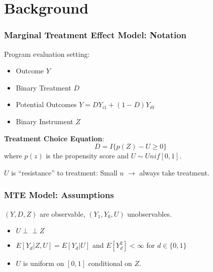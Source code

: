 \documentclass[11pt, aspectratio=169]{beamer}
\newcommand{\indep}{\perp\!\!\!\!\perp}
\begin{document}
\begin{frame}
    \tableofcontents
\end{frame}

\section{Background}

\begin{frame}
    \frametitle{Marginal Treatment Effect Model: Notation}

    Program evaluation setting:
    \begin{itemize}
        \item Outcome $Y$
        \item Binary Treatment $D$
        \item Potential Outcomes $Y = D Y_{i1} + (1-D) Y_{i0}$
        \item Binary Instrument $Z$
    \end{itemize}

    \vspace{0.5cm}

    \textbf{Treatment Choice Equation}:
    \begin{equation}
        D = I\{p(Z) - U \geq 0\}
    \end{equation}
    where $p(z)$ is the propensity score and $U\sim Unif[0,1]$.

    \vspace{0.5cm}

    $U$ is ``resistance'' to treatment: Small $u$ $\rightarrow$ always take treatment.

\end{frame}

\begin{frame}
    \frametitle{MTE Model: Assumptions}
    $(Y,D,Z)$ are observable, $(Y_1, Y_0, U)$ unobservables.


    \begin{itemize}
        \item $U \indep Z$
        \item $E[Y_d|Z,U] = E[Y_d|U]$ and $E[Y_d^2] < \infty$ for $d \in \{0,1\}$
        \item $U$ is uniform on $[0,1]$ conditional on $Z$.
    \end{itemize}

\end{frame}
\end{document}
